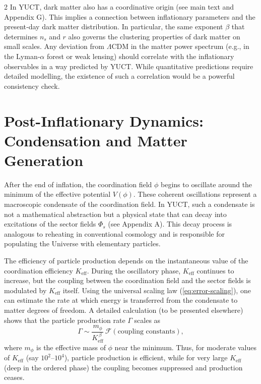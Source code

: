 \documentclass[12pt,a4paper]{article}
\newcommand{\Keff}{K_{\mathrm{eff}}}
\begin{document}
\begin{multicols}{2}
		In YUCT, dark matter also has a coordinative origin (see main text and Appendix G). This implies a connection between inflationary parameters and the present‑day dark matter distribution. In particular, the same exponent \(\beta\) that determines \(n_s\) and \(r\) also governs the clustering properties of dark matter on small scales. Any deviation from \(\Lambda\)CDM in the matter power spectrum (e.g., in the Lyman‑\(\alpha\) forest or weak lensing) should correlate with the inflationary observables in a way predicted by YUCT. While quantitative predictions require detailed modelling, the existence of such a correlation would be a powerful consistency check.
		
		\section{Post-Inflationary Dynamics: Condensation and Matter Generation}
		\label{sec:postinflation}
		
		After the end of inflation, the coordination field \(\phi\) begins to oscillate around the minimum of the effective potential \(V(\phi)\). These coherent oscillations represent a macroscopic condensate of the coordination field. In YUCT, such a condensate is not a mathematical abstraction but a physical state that can decay into excitations of the sector fields \(\Phi_s\) (see Appendix A). This decay process is analogous to reheating in conventional cosmology and is responsible for populating the Universe with elementary particles.
		
		The efficiency of particle production depends on the instantaneous value of the coordination efficiency \(\Keff\). During the oscillatory phase, \(\Keff\) continues to increase, but the coupling between the coordination field and the sector fields is modulated by \(\Keff\) itself. Using the universal scaling law (\ref{eq:error-scaling}), one can estimate the rate at which energy is transferred from the condensate to matter degrees of freedom. A detailed calculation (to be presented elsewhere) shows that the particle production rate \(\Gamma\) scales as
		\begin{equation}
			\Gamma \sim \frac{m_\phi}{\Keff^{\,\beta}} \, \mathcal{F}(\text{coupling constants}),
			\label{eq:gamma}
		\end{equation}
		where \(m_\phi\) is the effective mass of \(\phi\) near the minimum. Thus, for moderate values of \(\Keff\) (say \(10^2\)–\(10^4\)), particle production is efficient, while for very large \(\Keff\) (deep in the ordered phase) the coupling becomes suppressed and production ceases.
		

\end{multicols}
\end{document}
